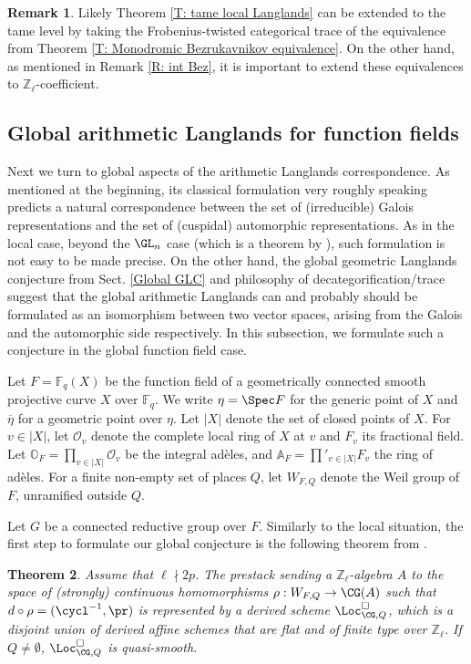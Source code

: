 \documentclass[11pt]{amsart}
\newtheorem{thm}{Theorem}[subsection]
\theoremstyle{definition}
\theoremstyle{definition}
\newtheorem{rmk}[thm]{Remark}
\theoremstyle{definition}
\numberwithin{equation}{section}
\newcommand{\bA}{{\mathbb A}}
\newcommand{\bF}{{\mathbb F}}
\newcommand{\bO}{{\mathbb O}}
\newcommand{\bZ}{{\mathbb Z}}
\newcommand{\mO}{{\mathcal O}}
\begin{document}
\begin{rmk}
Likely Theorem \ref{T: tame local Langlands} can be extended to the tame level by  taking the Frobenius-twisted categorical trace of the equivalence from Theorem \ref{T: Monodromic Bezrukavnikov equivalence}. On the other hand, as mentioned in Remark \ref{R: int Bez}, it is important to extend these equivalences to $\bZ_\ell$-coefficient.
\end{rmk}

\subsection{Global arithmetic Langlands for function fields}\label{S: Global Langlands function fields}
Next we turn to global aspects of the arithmetic Langlands correspondence. As mentioned at the beginning, its classical formulation very roughly speaking predicts a natural correspondence between the set of (irreducible) Galois representations and the set of (cuspidal) automorphic representations. As in the local case, beyond the $\GL_n$ case (which is a theorem by \cite{Lafforgue-GLn}), such formulation is not easy to be made precise. On the other hand,
the global geometric Langlands conjecture from Sect. \ref{Global GLC} and philosophy of decategorification/trace suggest that the global arithmetic Langlands can and probably should be formulated as an isomorphism between two vector spaces, arising from the Galois and the automorphic side respectively. In this subsection, we formulate such a conjecture in the global function field case.

Let $F=\bF_q(X)$ be the function field of a geometrically connected smooth projective curve $X$ over $\bF_q$.
We write $\eta=\Spec F$ for the generic point of $X$ and $\overline\eta$ for a geometric point over $\eta$. Let $|X|$ denote the set of closed points of $X$. For $v\in |X|$, let $\mO_v$ denote the complete local ring of $X$ at $v$ and $F_v$ its fractional field. Let
$\bO_F=\prod_{v\in|X|}\mO_v$ be the integral ad\`eles, and $\bA_F=\prod'_{v\in|X|}F_v$ the ring of ad\`eles. For a finite non-empty set of places $Q$, let $W_{F,Q}$ denote the Weil group of $F$, unramified outside $Q$. 

Let $G$ be a connected reductive group over $F$. Similarly to the local situation, the first step to formulate our global conjecture is the following theorem from \cite{Zhu-Conjecture}.
\begin{thm}
Assume that $\ell\nmid 2p$.  The prestack sending a $\bZ_\ell$-algebra $A$ to the space of (strongly) continuous homomorphisms $\rho: W_{F,Q}\to \CG(A)$ such that $d\circ\rho=(\cycl^{-1},\pr)$ is represented by a derived scheme $\Loc_{\CG,Q}^\Box$, which is a disjoint union of derived affine schemes that are flat and of finite type over $\bZ_\ell$. If $Q\neq\emptyset$, $\Loc_{\CG,Q}^\Box$ is quasi-smooth. 
\end{thm}
\end{document}
